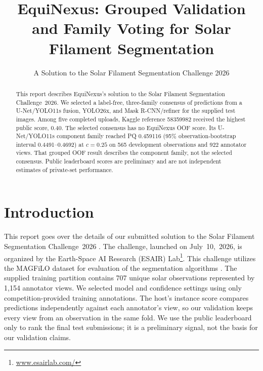 \documentclass[sigconf]{acmart}
\begin{document}
\title{EquiNexus: Grouped Validation and Family Voting for Solar Filament Segmentation}
\subtitle{A Solution to the Solar Filament Segmentation Challenge 2026} %


\author{}

\author{}

\author{}

\begin{abstract}
    This report describes EquiNexus's solution to the Solar Filament Segmentation Challenge~2026. We selected a label-free, three-family consensus of predictions from a U-Net/YOLO11s fusion, YOLO26x, and Mask R-CNN/refiner for the supplied test images. Among five completed uploads, Kaggle reference 58359982 received the highest public score, 0.40. The selected consensus has no EquiNexus OOF score. Its U-Net/YOLO11s component family reached PQ 0.459116 (95\% observation-bootstrap interval 0.4491--0.4692) at $c=0.25$ on 565 development observations and 922 annotator views. That grouped OOF result describes the component family, not the selected consensus. Public leaderboard scores are preliminary and are not independent estimates of private-set performance.
\end{abstract}

\maketitle





\section{Introduction}
    This report goes over the details of our submitted solution to the Solar Filament Segmentation Challenge~2026 \cite{filament-segmentation-2026}. The challenge, launched on July~10,~2026, is organized by the Earth-Space AI Research (ESAIR) Lab\footnote{\href{https://www.esairlab.com/home}{www.esairlab.com/}}. This challenge utilizes the MAGFiLO dataset for evaluation of the segmentation algorithms \cite{ahmadzadeh2024dataset}. The supplied training partition contains 707 unique solar observations represented by 1,154 annotator views. We selected model and confidence settings using only competition-provided training annotations. The host's instance score compares predictions independently against each annotator's view, so our validation keeps every view from an observation in the same fold. We use the public leaderboard only to rank the final test submissions; it is a preliminary signal, not the basis for our validation claims.
\end{document}

